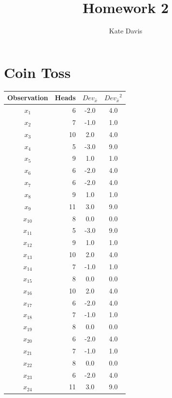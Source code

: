 \documentclass[nohyper,justified]{tufte-handout}\usepackage[]{graphicx}\usepackage[]{color}
\title{Homework 2}
\author{Kate Davis}
\newcommand{\dev}[1] {Dev_{\bar{#1}}}
\begin{document}
\maketitle
\section{Coin Toss}
\begin{margintable}
\begin{tabular}{cr|c|c|}
  \toprule
Observation & Heads & $\dev{x}$ & ${\dev{x}}^2$ \\ 
  \midrule
$x_{1}$ & 6 & -2.0 & 4.0 \\ 
   \rowcolor[gray]{0.95}$x_{2}$ & 7 & -1.0 & 1.0 \\ 
  $x_{3}$ & 10 & 2.0 & 4.0 \\ 
   \rowcolor[gray]{0.95}$x_{4}$ & 5 & -3.0 & 9.0 \\ 
  $x_{5}$ & 9 & 1.0 & 1.0 \\ 
   \rowcolor[gray]{0.95}$x_{6}$ & 6 & -2.0 & 4.0 \\ 
  $x_{7}$ & 6 & -2.0 & 4.0 \\ 
   \rowcolor[gray]{0.95}$x_{8}$ & 9 & 1.0 & 1.0 \\ 
  $x_{9}$ & 11 & 3.0 & 9.0 \\ 
   \rowcolor[gray]{0.95}$x_{10}$ & 8 & 0.0 & 0.0 \\ 
  $x_{11}$ & 5 & -3.0 & 9.0 \\ 
   \rowcolor[gray]{0.95}$x_{12}$ & 9 & 1.0 & 1.0 \\ 
  $x_{13}$ & 10 & 2.0 & 4.0 \\ 
   \rowcolor[gray]{0.95}$x_{14}$ & 7 & -1.0 & 1.0 \\ 
  $x_{15}$ & 8 & 0.0 & 0.0 \\ 
   \rowcolor[gray]{0.95}$x_{16}$ & 10 & 2.0 & 4.0 \\ 
  $x_{17}$ & 6 & -2.0 & 4.0 \\ 
   \rowcolor[gray]{0.95}$x_{18}$ & 7 & -1.0 & 1.0 \\ 
  $x_{19}$ & 8 & 0.0 & 0.0 \\ 
   \rowcolor[gray]{0.95}$x_{20}$ & 6 & -2.0 & 4.0 \\ 
  $x_{21}$ & 7 & -1.0 & 1.0 \\ 
   \rowcolor[gray]{0.95}$x_{22}$ & 8 & 0.0 & 0.0 \\ 
  $x_{23}$ & 6 & -2.0 & 4.0 \\ 
   \rowcolor[gray]{0.95}$x_{24}$ & 11 & 3.0 & 9.0 \\ 

\end{tabular}
\end{margintable}
\end{document}

